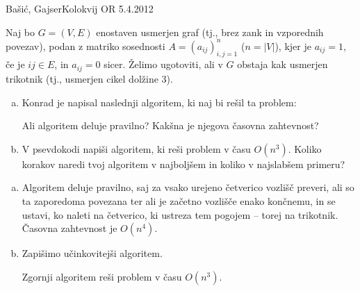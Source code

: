 \begin{naloga}{Bašić, Gajser}{Kolokvij OR 5.4.2012}
\begin{vprasanje}
Naj bo $G = (V, E)$ enostaven usmerjen graf
(tj., brez zank in vzporednih povezav),
podan z matriko sosednosti $A = (a_{ij})_{i,j=1}^n$ ($n = |V|$),
kjer je $a_{ij} = 1$, če je $ij \in E$, in $a_{ij} = 0$ sicer.
Želimo ugotoviti, ali v $G$ obstaja kak usmerjen trikotnik
(tj., usmerjen cikel dolžine $3$).
\begin{enumerate}[(a)]
\item Konrad je napisal naslednji algoritem, ki naj bi rešil ta problem:
\begin{small}
\begin{algorithmic}
                    \State \Return \True
                \EndIf
            \EndFor
        \EndFor
    \EndFor
\EndFor
\State \Return \False
\end{algorithmic}
\end{small}
Ali algoritem deluje pravilno?
Kakšna je njegova časovna zahtevnost?

\item V psevdokodi napiši algoritem, ki reši problem v času $O(n^3)$.
Koliko korakov naredi tvoj algoritem v najboljšem
in koliko v najslabšem primeru?
\end{enumerate}
\end{vprasanje}

\begin{odgovor}
\begin{enumerate}[(a)]
\item Algoritem deluje pravilno,
saj za vsako urejeno četverico vozlišč preveri,
ali so ta zaporedoma povezana ter ali je začetno vozlišče enako končnemu,
in se ustavi, ko naleti na četverico, ki ustreza tem pogojem
-- torej na trikotnik.
Časovna zahtevnost je $O(n^4)$.

\item Zapišimo učinkovitejši algoritem.
\begin{small}
\begin{algorithmic}
                    \State \Return \True
                \EndIf
            \EndFor
        \EndIf
    \EndFor
\EndFor
\State \Return \False
\end{algorithmic}
\end{small}
Zgornji algoritem reši problem v času $O(n^3)$.


\end{enumerate}
\end{odgovor}
\end{naloga}
